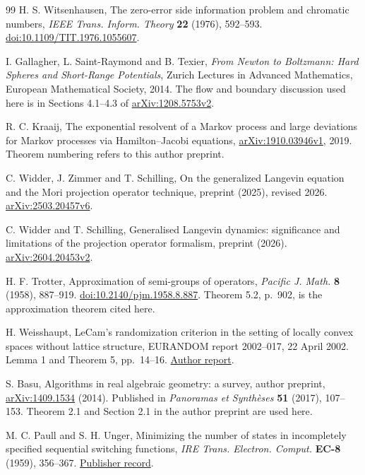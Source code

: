 \begin{thebibliography}{99}
H. S. Witsenhausen, The zero-error side information problem and chromatic
numbers, \emph{IEEE Trans. Inform. Theory} \textbf{22} (1976), 592--593.
\href{https://doi.org/10.1109/TIT.1976.1055607}{doi:10.1109/TIT.1976.1055607}.

I. Gallagher, L. Saint-Raymond and B. Texier,
\emph{From Newton to Boltzmann: Hard Spheres and Short-Range Potentials},
Zurich Lectures in Advanced Mathematics, European Mathematical Society, 2014.
The flow and boundary discussion used here is in Sections 4.1--4.3 of
\href{https://arxiv.org/abs/1208.5753v2}{arXiv:1208.5753v2}.

R. C. Kraaij, The exponential resolvent of a Markov process and large
deviations for Markov processes via Hamilton--Jacobi equations,
\href{https://arxiv.org/abs/1910.03946v1}{arXiv:1910.03946v1}, 2019.
Theorem numbering refers to this author preprint.


C. Widder, J. Zimmer and T. Schilling,
On the generalized Langevin equation and the Mori projection operator technique,
preprint (2025), revised 2026.
\href{https://arxiv.org/abs/2503.20457v6}{arXiv:2503.20457v6}.

C. Widder and T. Schilling,
Generalised Langevin dynamics: significance and limitations of the
projection operator formalism, preprint (2026).
\href{https://arxiv.org/abs/2604.20453v2}{arXiv:2604.20453v2}.

H. F. Trotter, Approximation of semi-groups of operators,
\emph{Pacific J. Math.} \textbf{8} (1958), 887--919.
\href{https://doi.org/10.2140/pjm.1958.8.887}{doi:10.2140/pjm.1958.8.887}.
Theorem 5.2, p.~902, is the approximation theorem cited here.


H. Weisshaupt, LeCam's randomization criterion in the setting of locally
convex spaces without lattice structure, EURANDOM report 2002--017,
22 April 2002. Lemma 1 and Theorem 5, pp.~14--16.
\href{https://www.eurandom.tue.nl/reports/2002/017-report.pdf}{Author report}.

S. Basu, Algorithms in real algebraic geometry: a survey, author preprint,
\href{https://arxiv.org/abs/1409.1534}{arXiv:1409.1534} (2014).
Published in \emph{Panoramas et Synth\`eses} \textbf{51} (2017), 107--153.
Theorem 2.1 and Section 2.1 in the author preprint are used here.

M. C. Paull and S. H. Unger, Minimizing the number of states in incompletely
specified sequential switching functions, \emph{IRE Trans. Electron.
Comput.} \textbf{EC-8} (1959), 356--367.
\href{https://ieeexplore.ieee.org/document/5222697}{Publisher record}.

\end{thebibliography}
